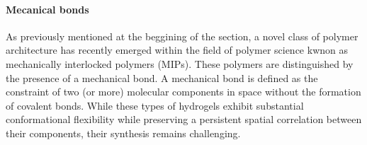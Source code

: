 \paragraph{Mecanical bonds}
As previously mentioned at the beggining of the section, a novel class of polymer architecture has recently emerged within the field of polymer science kwnon as mechanically interlocked polymers (MIPs). 
These polymers are distinguished by the presence of a mechanical bond.
A mechanical bond is defined as the constraint of two (or more) molecular components in space without the formation of covalent bonds\citep{hartMaterialPropertiesApplications2021}.
While these types of hydrogels exhibit substantial conformational flexibility while preserving a persistent spatial correlation between their components, their synthesis remains challenging.



